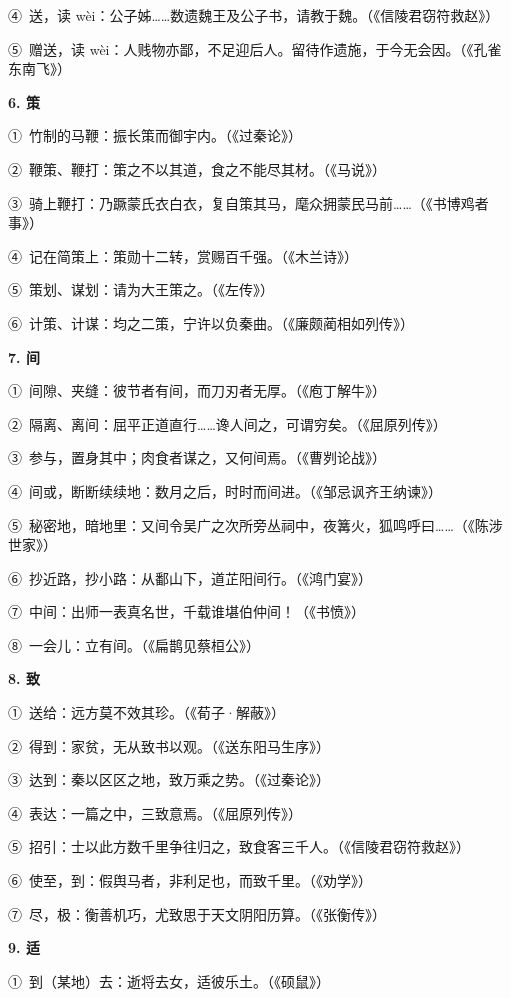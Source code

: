 ④\ 送，读 wèi：公子姊……数遗魏王及公子书，请教于魏。（《信陵君窃符救赵》）

⑤\ 赠送，读 wèi：人贱物亦鄙，不足迎后人。留待作遗施，于今无会因。（《孔雀东南飞》）

\textbf{6. 策}

①\ 竹制的马鞭：振长策而御宇内。（《过秦论》）

②\ 鞭策、鞭打：策之不以其道，食之不能尽其材。（《马说》）

③\ 骑上鞭打：乃蹶蒙氏衣白衣，复自策其马，麾众拥蒙民马前……（《书博鸡者事》）

④\ 记在简策上：策勋十二转，赏赐百千强。（《木兰诗》）

⑤\ 策划、谋划：请为大王策之。（《左传》）

⑥\ 计策、计谋：均之二策，宁许以负秦曲。（《廉颇蔺相如列传》）

\textbf{7. 间}

①\ 间隙、夹缝：彼节者有间，而刀刃者无厚。（《庖丁解牛》）

②\ 隔离、离间：屈平正道直行……谗人间之，可谓穷矣。（《屈原列传》）

③\ 参与，置身其中；肉食者谋之，又何间焉。（《曹刿论战》）

④\ 间或，断断续续地：数月之后，时时而间进。（《邹忌讽齐王纳谏》）

⑤\ 秘密地，暗地里：又间令吴广之次所旁丛祠中，夜篝火，狐鸣呼曰……（《陈涉世家》）

⑥\ 抄近路，抄小路：从鄱山下，道芷阳间行。（《鸿门宴》）

⑦\ 中间：出师一表真名世，千载谁堪伯仲间！（《书愤》）

⑧\ 一会儿：立有间。（《扁鹊见蔡桓公》）

\textbf{8. 致}

①\ 送给：远方莫不效其珍。（《荀子·解蔽》）

②\ 得到：家贫，无从致书以观。（《送东阳马生序》）

③\ 达到：秦以区区之地，致万乘之势。（《过秦论》）

④\ 表达：一篇之中，三致意焉。（《屈原列传》）

⑤\ 招引：士以此方数千里争往归之，致食客三千人。（《信陵君窃符救赵》）

⑥\ 使至，到：假舆马者，非利足也，而致千里。（《劝学》）

⑦\ 尽，极：衡善机巧，尤致思于天文阴阳历算。（《张衡传》）

\textbf{9. 适}

①\ 到（某地）去：逝将去女，适彼乐土。（《硕鼠》）

